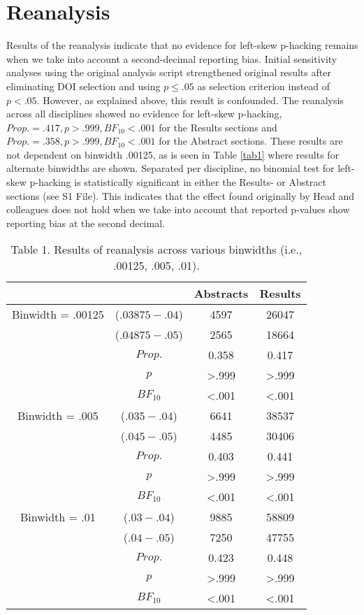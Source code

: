 \section*{Reanalysis}
Results of the reanalysis indicate that no evidence for left-skew p-hacking remains when we take into account a second-decimal reporting bias. Initial sensitivity analyses using the original analysis script strengthened original results after eliminating DOI selection and using $p\leq.05$ as selection criterion instead of $p<.05$. However, as explained above, this result is confounded. The reanalysis across all disciplines showed no evidence for left-skew p-hacking, $Prop.=.417,p>.999, BF_{10}<.001$ for the Results sections and $Prop.=.358,p>.999,BF_{10}<.001$ for the Abstract sections. These results are not dependent on binwidth .00125, as is seen in Table \ref{tab1} where results for alternate binwidths are shown.  Separated per discipline, no binomial test for left-skew p-hacking is statistically significant in either the Results- or Abstract sections (see S1 File). This indicates that the effect found originally by Head and colleagues does not hold when we take into account that reported p-values show reporting bias at the second decimal.

\begin{table}[htbp]
    \begin{tabular}{cccc}
              &       & Abstracts & Results \\
              \hline
      Binwidth = .00125 & ($.03875-.04$) & 4597  & 26047 \\
          & ($.04875-.05$) & 2565  & 18664 \\
          & $Prop.$ & 0.358 & 0.417 \\
          & $p$     & >.999 & >.999 \\
          & $BF_{10}$  & <.001 & <.001 \\
    Binwidth = .005 & ($.035-.04$) & 6641  & 38537 \\
          & ($.045-.05$) & 4485  & 30406 \\
          & $Prop.$ & 0.403 & 0.441 \\
          & $p$     & >.999 & >.999 \\
          & $BF_{10}$  & <.001 & <.001 \\
    Binwidth = .01 & ($.03-.04$) & 9885  & 58809 \\
          & ($.04-.05$) & 7250  & 47755 \\
          & $Prop.$ & 0.423 & 0.448 \\
          & $p$     & >.999 & >.999 \\
          & $BF_{10}$  & <.001 & <.001 \\

    \end{tabular}
    \caption{Table 1. Results of reanalysis across various binwidths (i.e., .00125, .005, .01).} 
\end{table}
  
